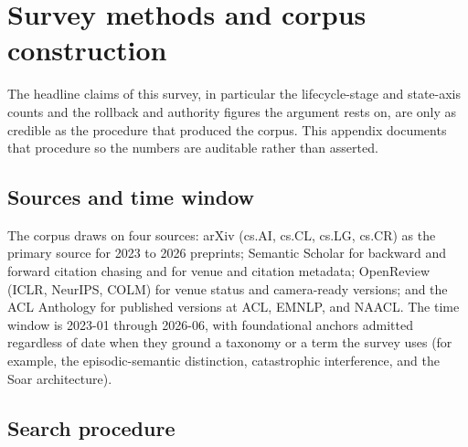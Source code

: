 \appendix
\section{Survey methods and corpus construction}\label{app:methods}

The headline claims of this survey, in particular the lifecycle-stage and
state-axis counts and the rollback and authority figures the argument
rests on, are only as credible as the procedure that produced the corpus. This
appendix documents that procedure so the numbers are auditable rather than
asserted.

\subsection{Sources and time window}

The corpus draws on four sources: arXiv (cs.AI, cs.CL, cs.LG, cs.CR) as the
primary source for 2023 to 2026 preprints; Semantic Scholar for backward and
forward citation chasing and for venue and citation metadata; OpenReview (ICLR,
NeurIPS, COLM) for venue status and camera-ready versions; and the ACL Anthology
for published versions at ACL, EMNLP, and NAACL. The time window is 2023-01
through 2026-06, with foundational anchors admitted regardless of date when they
ground a taxonomy or a term the survey uses (for example, the episodic-semantic
distinction, catastrophic interference, and the Soar architecture).

\subsection{Search procedure}

